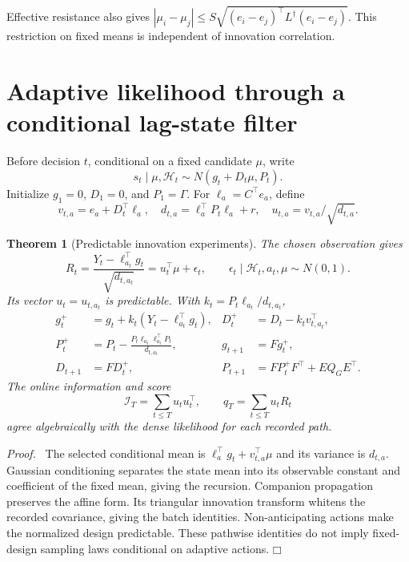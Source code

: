 \documentclass[11pt]{article}
\newtheorem{theorem}{Theorem}
\newenvironment{proof}{\par\noindent\textit{Proof.}\ }{\hfill$\mdlgwhtsquare$\par\medskip}
\begin{document}
Effective resistance also gives $|\mu_i-\mu_j|\le S\sqrt{(e_i-e_j)^\top L^\dagger(e_i-e_j)}$. This restriction on fixed means is independent of innovation correlation.

\section{Adaptive likelihood through a conditional lag-state filter}
Before decision $t$, conditional on a fixed candidate $\mu$, write
\begin{equation}
s_t\mid\mu,\mathcal H_t\sim N(g_t+D_t\mu,P_t).
\end{equation}
Initialize $g_1=0$, $D_1=0$, and $P_1=\Gamma$. For $\ell_a=C^\top e_a$, define
\begin{equation}
v_{t,a}=e_a+D_t^\top\ell_a,\quad
d_{t,a}=\ell_a^\top P_t\ell_a+r,\quad
u_{t,a}=v_{t,a}/\sqrt{d_{t,a}}.
\label{eq:experiment}
\end{equation}
\begin{theorem}[Predictable innovation experiments]
The chosen observation gives
\begin{equation}
\boxed{R_t=\frac{Y_t-\ell_{a_t}^\top g_t}{\sqrt{d_{t,a_t}}}
=u_t^\top\mu+\epsilon_t,\qquad
\epsilon_t\mid\mathcal H_t,a_t,\mu\sim N(0,1).}
\label{eq:regression}
\end{equation}
Its vector $u_t=u_{t,a_t}$ is predictable. With $k_t=P_t\ell_{a_t}/d_{t,a_t}$,
\begin{align}
g_t^+&=g_t+k_t(Y_t-\ell_{a_t}^\top g_t),&
D_t^+&=D_t-k_tv_{t,a_t}^\top,\nonumber\\
P_t^+&=P_t-\frac{P_t\ell_{a_t}\ell_{a_t}^\top P_t}{d_{t,a_t}},&
g_{t+1}&=Fg_t^+,\nonumber\\
D_{t+1}&=FD_t^+,&P_{t+1}&=FP_t^+F^\top+EQ_GE^\top.
\label{eq:filter}
\end{align}
The online information and score
\begin{equation}
\mathcal I_T=\sum_{t\le T}u_tu_t^\top,\qquad q_T=\sum_{t\le T}u_tR_t
\label{eq:online}
\end{equation}
agree algebraically with the dense likelihood for each recorded path.
\end{theorem}
\begin{proof}
The selected conditional mean is $\ell_a^\top g_t+v_{t,a}^\top\mu$ and its variance is $d_{t,a}$. Gaussian conditioning separates the state mean into its observable constant and coefficient of the fixed mean, giving the recursion. Companion propagation preserves the affine form. Its triangular innovation transform whitens the recorded covariance, giving the batch identities. Non-anticipating actions make the normalized design predictable. These pathwise identities do not imply fixed-design sampling laws conditional on adaptive actions.
\end{proof}
\end{document}
